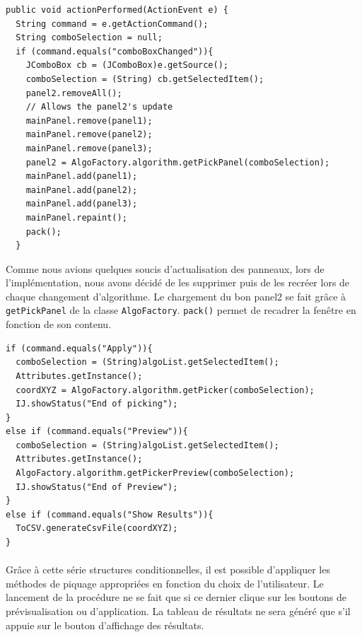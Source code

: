 \begin{center}
\begin{fmpage}{15cm}
\begin{small}
\begin{lstlisting}[breaklines=true, breakatwhitespace=true]
public void actionPerformed(ActionEvent e) {
  String command = e.getActionCommand();
  String comboSelection = null;
  if (command.equals("comboBoxChanged")){
    JComboBox cb = (JComboBox)e.getSource();
    comboSelection = (String) cb.getSelectedItem();
    panel2.removeAll();
    // Allows the panel2's update
    mainPanel.remove(panel1);
    mainPanel.remove(panel2);
    mainPanel.remove(panel3);
    panel2 = AlgoFactory.algorithm.getPickPanel(comboSelection);
    mainPanel.add(panel1);
    mainPanel.add(panel2);
    mainPanel.add(panel3);
    mainPanel.repaint();
    pack();
  }
\end{lstlisting}
\end{small}
\end{fmpage}
\end{center}

Comme nous avions quelques soucis d'actualisation des panneaux, lors de l'implémentation, nous avons décidé de les supprimer puis de les recréer lors de chaque changement d'algorithme. Le chargement du bon panel2 se fait gr\^ace à \texttt{getPickPanel} de la classe \texttt{AlgoFactory}. \texttt{pack()} permet de recadrer la fenêtre en fonction de son contenu. 

\begin{center}
\begin{fmpage}{15cm}
\begin{small}
\begin{lstlisting}
if (command.equals("Apply")){
  comboSelection = (String)algoList.getSelectedItem();
  Attributes.getInstance();
  coordXYZ = AlgoFactory.algorithm.getPicker(comboSelection);
  IJ.showStatus("End of picking");
}
else if (command.equals("Preview")){
  comboSelection = (String)algoList.getSelectedItem();
  Attributes.getInstance();
  AlgoFactory.algorithm.getPickerPreview(comboSelection);
  IJ.showStatus("End of Preview");
}
else if (command.equals("Show Results")){
  ToCSV.generateCsvFile(coordXYZ);
}
\end{lstlisting}
\end{small}	
\end{fmpage}
\end{center}

\paragraph*{}
Grâce à cette série structures conditionnelles, il est possible d'appliquer les méthodes de piquage appropriées en fonction du choix de l'utilisateur. Le lancement de la procédure ne se fait que si ce dernier clique sur les boutons de prévisualisation ou d'application. La tableau de résultats ne sera généré que s'il appuie sur le bouton d'affichage des résultats. 

